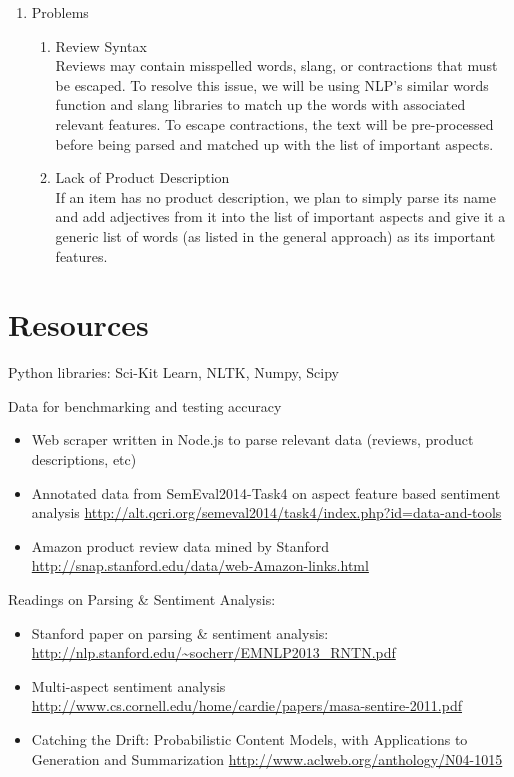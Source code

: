 \documentclass{article}
\begin{document}
\begin{enumerate}
\item Problems 
	\begin{enumerate} [label* = \arabic*.]
	\item Review Syntax \\
	Reviews may contain misspelled words, slang, or contractions that must be escaped. To resolve this issue, we will be using NLP's similar words function and slang libraries to match up the words with associated relevant features. To escape contractions, the text will be pre-processed before being parsed and matched up with the list of important aspects.
	\item Lack of Product Description \\
	If an item has no product description, we plan to simply parse its name and add adjectives from it into the list of important aspects and give it a generic list of words (as listed in the general approach) as its important features.
	\end{enumerate}
\end{enumerate}

\section{Resources}

Python libraries: Sci-Kit Learn, NLTK, Numpy, Scipy

Data for benchmarking and testing accuracy

\begin{itemize}
\item Web scraper written in Node.js to parse relevant data (reviews, product descriptions, etc)
\newline 

\item Annotated data from SemEval2014-Task4 on aspect feature based sentiment analysis
\newline
\url{http://alt.qcri.org/semeval2014/task4/index.php?id=data-and-tools}

\item Amazon product review data mined by Stanford
\newline
\url{http://snap.stanford.edu/data/web-Amazon-links.html}
\end{itemize}

Readings on Parsing \& Sentiment Analysis:
\begin{itemize}
\item Stanford paper on parsing \& sentiment analysis:
\newline
\url{http://nlp.stanford.edu/~socherr/EMNLP2013_RNTN.pdf}

\item Multi-aspect sentiment analysis
\newline 
\url{http://www.cs.cornell.edu/home/cardie/papers/masa-sentire-2011.pdf}

\item Catching the Drift: Probabilistic Content Models, with Applications to
Generation and Summarization \newline
\url{http://www.aclweb.org/anthology/N04-1015}
\end{itemize}
\end{document}
